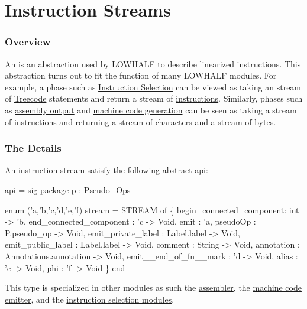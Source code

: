 \section{Instruction Streams}

\subsubsection{Overview}
An 
is an abstraction used by LOWHALF to describe linearized instructions.
This abstraction turns out to fit the function of
many LOWHALF modules.  For example,
a phase such as \href{instrsel.html}{Instruction Selection} 
can be viewed as taking an stream of 
\href{treecode.html}{Treecode} statements and return a
stream of \href{instructions.html}{instructions}.  Similarly,
phases such as \href{asm.html}{assembly output} and
\href{mc.html}{machine code generation} can be seen 
as taking a stream of instructions and 
returning a stream of characters and a stream of bytes.

\subsubsection{The Details}
An instruction stream satisfy the following abstract api:
\begin{SML}
api  =
sig
   package p : \href{pseudo-ops.html}{Pseudo_Ops}

   enum ('a,'b,'c,'d,'e,'f) stream =
      STREAM of
      \{ begin_connected_component: int -> 'b,  
        end_connected_component  : 'c -> Void, 
        emit        : 'a,        
        pseudoOp    : P.pseudo_op -> Void,
        emit_private_label : Label.label -> Void,
        emit_public_label  : Label.label -> Void,
        comment     : String -> Void,    
        annotation  : Annotations.annotation -> Void,
        emit__end_of_fn__mark   : 'd -> Void,
        alias       : 'e -> Void, 
        phi         : 'f -> Void  
      \}
end
\end{SML}
This type is specialized in other modules as such the
\href{asm.html}{assembler}, the \href{mc.html}{machine code emitter},
and the \href{instrsel.html}{instruction selection modules}.
